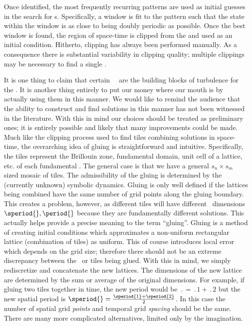Once identified, the most frequently recurring patterns are used
as initial guesses in the search for {\fpo}s. Specifically, a {\spt} window is
fit to the pattern such that the state within the window is as close to being
doubly periodic as possible. Once the best window is found, the region of space-time
is clipped from the {\po} and used as an initial condition.
Hitherto, clipping has always been performed manually. As a consequence there
is substantial variability in clipping quality;
multiple clippings may be necessary to find a single {\fpo}.



It is one thing to claim that certain \spt\ \twots\ are the building blocks
of turbulence for the \KSe. It is
another thing entirely to put our money where our mouth is by actually using them in this manner. We would like to remind the audience that the ability to construct and find solutions in this manner
has not been witnessed in the literature. With this in mind our choices should
be treated as preliminary ones; it is entirely possible and likely that
many improvements could be made.
Much like the clipping process used to find tiles combining solutions in space-time,
the overarching idea of gluing is straightforward and intuitive.
Specifically, the tiles represent the
Brillouin zone, fundamental domain, unit cell of a lattice, etc.
of each fundamental \twot.
The general case is that we have a general $s_n \times s_m$ sized mosaic of tiles.
The admissibility of the gluing is determined by the (currently unknown) symbolic
dynamics. Gluing is only well defined if the lattices being combined have the same
number of grid points along the gluing boundary.
This creates a problem, however, as
different tiles will have different \spt\ dimensions $\speriod{},\period{}$ because
they are fundamentally different solutions.
This actually helps provide a precise meaning to the term ``gluing''.
Gluing is a method of creating initial conditions which approximates
a non-uniform rectangular lattice (combination of tiles) as uniform.
This of course introduces local error which depends on the grid size; therefore
there should not be an extreme discrepancy between the \twots\ or tiles being glued.
With this in mind, we simply rediscretize and concatenate the new lattices.
The dimensions of the new lattice are determined by the sum or average of
the original dimensions.
For example, if gluing two tiles together in time, the new period would be
$\period{} = \period{1} + \period{2}$ but the new spatial period is
$\speriod{} = \frac{\speriod{1} + \speriod{2}}{2}$.
In this case the number of spatial grid \emph{points} and temporal grid \emph{spacing}
should be the same. There are many more complicated alternatives, limited only by
the imagination.

